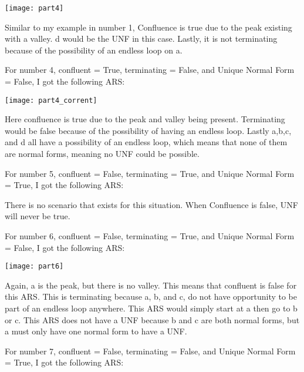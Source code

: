 \documentclass{article}
\theoremstyle{theorem}
\theoremstyle{definition}
\theoremstyle{remark}
\begin{document}
\texttt{[image: part4]}

\noindent\newline Similar to my example in number 1, Confluence is true due to the peak existing with a valley. d would be the UNF in this case. Lastly, it is not terminating because of the possibility of an endless loop on a.

\hrulefill

\noindent\newline\newline For number 4, confluent = True, terminating = False, and Unique Normal Form = False, I got the following ARS:

\texttt{[image: part4\_corrent]}

\noindent\newline Here confluence is true due to the peak and valley being present. Terminating would be false because of the possibility of having an endless loop. Lastly a,b,c, and d all have a possibility of an endless loop, which means that none of them are normal forms, meaning no UNF could be possible.

\hrulefill

\noindent\newline\newline For number 5, confluent = False, terminating = True, and Unique Normal Form = True, I got the following ARS:

\noindent\newline There is no scenario that exists for this situation. When Confluence is false, UNF will never be true. 

\hrulefill

\noindent\newline\newline For number 6, confluent = False, terminating = True, and Unique Normal Form = False, I got the following ARS:

\texttt{[image: part6]}

\noindent\newline Again, a is the peak, but there is no valley. This means that confluent is false for this ARS. This is terminating because a, b, and c, do not have opportunity to be part of an endless loop anywhere. This ARS would simply start at a then go to b or c. This ARS does not have a UNF because b and c are both normal forms, but a must only have one normal form to have a UNF. 

\hrulefill

\noindent\newline\newline For number 7, confluent = False, terminating = False, and Unique Normal Form = True, I got the following ARS:
\end{document}
